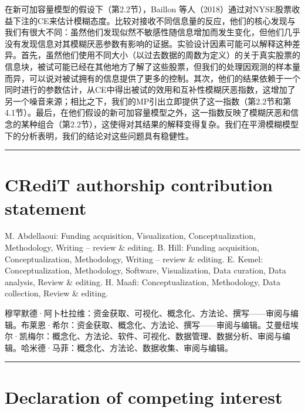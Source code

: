 \documentclass[12pt,a4paper]{article}
\newenvironment{original}
  {\par\vspace{0.5em}\noindent\color{black}\ignorespaces}
  {\par\vspace{0.3em}}
\newenvironment{translation}
  {\par\noindent\color{transblue}\ignorespaces}
  {\par\vspace{0.8em}\hrule\vspace{0.5em}}
\begin{document}
\begin{translation}
在新可加容量模型的假设下（第2.2节），Baillon 等人（2018）通过对NYSE股票收益下注的CE来估计模糊态度。比较对接收不同信息量的反应，他们的核心发现与我们有很大不同：虽然他们发现似然不敏感性随信息增加而发生变化，但他们几乎没有发现信息对其模糊厌恶参数有影响的证据。实验设计因素可能可以解释这种差异。首先，虽然他们使用不同大小（以过去数据的周数为定义）的关于真实股票的信息块，被试可能已经在其他地方了解了这些股票，但我们的处理因观测的样本量而异，可以说对被试拥有的信息提供了更多的控制。其次，他们的结果依赖于一个同时进行的参数估计，从CE中得出被试的效用和互补性模糊厌恶指数，这增加了另一个噪音来源；相比之下，我们的MP引出立即提供了这一指数（第2.2节和第4.1节）。最后，在他们假设的新可加容量模型之外，这一指数反映了模糊厌恶和信念的某种组合（第2.2节），这使得对其结果的解释变得复杂。我们在平滑模糊模型下的分析表明，我们的结论对这些问题具有稳健性。
\end{translation}

\section*{CRediT authorship contribution statement}

\begin{original}
M. Abdellaoui: Funding acquisition, Visualization, Conceptualization, Methodology, Writing -- review \& editing. B. Hill: Funding acquisition, Conceptualization, Methodology, Writing -- review \& editing. E. Kemel: Conceptualization, Methodology, Software, Visualization, Data curation, Data analysis, Review \& editing. H. Maafi: Conceptualization, Methodology, Data collection, Review \& editing.
\end{original}

\begin{translation}
穆罕默德·阿卜杜拉维：资金获取、可视化、概念化、方法论、撰写——审阅与编辑。布莱恩·希尔：资金获取、概念化、方法论、撰写——审阅与编辑。艾曼纽埃尔·凯梅尔：概念化、方法论、软件、可视化、数据管理、数据分析、审阅与编辑。哈米德·马菲：概念化、方法论、数据收集、审阅与编辑。
\end{translation}

\section*{Declaration of competing interest}
\end{document}
